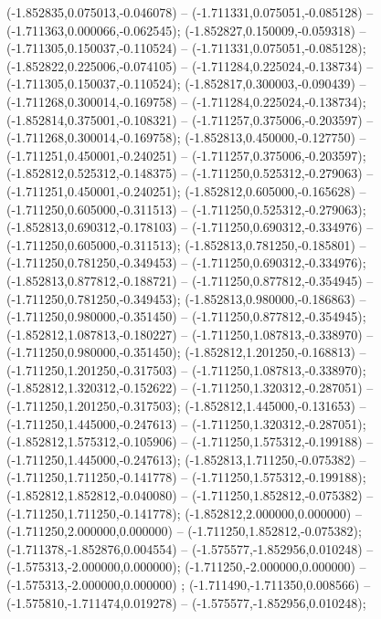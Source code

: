  (-1.852835,0.075013,-0.046078) -- (-1.711331,0.075051,-0.085128) -- (-1.711363,0.000066,-0.062545);
 (-1.852827,0.150009,-0.059318) -- (-1.711305,0.150037,-0.110524) -- (-1.711331,0.075051,-0.085128);
 (-1.852822,0.225006,-0.074105) -- (-1.711284,0.225024,-0.138734) -- (-1.711305,0.150037,-0.110524);
 (-1.852817,0.300003,-0.090439) -- (-1.711268,0.300014,-0.169758) -- (-1.711284,0.225024,-0.138734);
 (-1.852814,0.375001,-0.108321) -- (-1.711257,0.375006,-0.203597) -- (-1.711268,0.300014,-0.169758);
 (-1.852813,0.450000,-0.127750) -- (-1.711251,0.450001,-0.240251) -- (-1.711257,0.375006,-0.203597);
 (-1.852812,0.525312,-0.148375) -- (-1.711250,0.525312,-0.279063) -- (-1.711251,0.450001,-0.240251);
 (-1.852812,0.605000,-0.165628) -- (-1.711250,0.605000,-0.311513) -- (-1.711250,0.525312,-0.279063);
 (-1.852813,0.690312,-0.178103) -- (-1.711250,0.690312,-0.334976) -- (-1.711250,0.605000,-0.311513);
 (-1.852813,0.781250,-0.185801) -- (-1.711250,0.781250,-0.349453) -- (-1.711250,0.690312,-0.334976);
 (-1.852813,0.877812,-0.188721) -- (-1.711250,0.877812,-0.354945) -- (-1.711250,0.781250,-0.349453);
 (-1.852813,0.980000,-0.186863) -- (-1.711250,0.980000,-0.351450) -- (-1.711250,0.877812,-0.354945);
 (-1.852812,1.087813,-0.180227) -- (-1.711250,1.087813,-0.338970) -- (-1.711250,0.980000,-0.351450);
 (-1.852812,1.201250,-0.168813) -- (-1.711250,1.201250,-0.317503) -- (-1.711250,1.087813,-0.338970);
 (-1.852812,1.320312,-0.152622) -- (-1.711250,1.320312,-0.287051) -- (-1.711250,1.201250,-0.317503);
 (-1.852812,1.445000,-0.131653) -- (-1.711250,1.445000,-0.247613) -- (-1.711250,1.320312,-0.287051);
 (-1.852812,1.575312,-0.105906) -- (-1.711250,1.575312,-0.199188) -- (-1.711250,1.445000,-0.247613);
 (-1.852813,1.711250,-0.075382) -- (-1.711250,1.711250,-0.141778) -- (-1.711250,1.575312,-0.199188);
 (-1.852812,1.852812,-0.040080) -- (-1.711250,1.852812,-0.075382) -- (-1.711250,1.711250,-0.141778);
 (-1.852812,2.000000,0.000000) -- (-1.711250,2.000000,0.000000) -- (-1.711250,1.852812,-0.075382);
 (-1.711378,-1.852876,0.004554) -- (-1.575577,-1.852956,0.010248) -- (-1.575313,-2.000000,0.000000);
 (-1.711250,-2.000000,0.000000) -- (-1.575313,-2.000000,0.000000) ;
 (-1.711490,-1.711350,0.008566) -- (-1.575810,-1.711474,0.019278) -- (-1.575577,-1.852956,0.010248);

